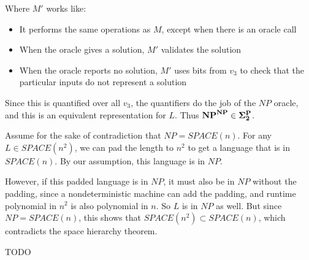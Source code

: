 \documentclass{article}
\newenvironment{problem}[2][Problem]{\begin{trivlist}
\item[\hskip \labelsep {\bfseries #1}\hskip \labelsep {\bfseries #2.}]}{\end{trivlist}}
\begin{document}
\begin{problem}{1}
  Where $M'$ works like:
  
  \begin{itemize}
    \item It performs the same operations as $M$, except when there is
      an oracle call
    \item When the oracle gives a solution, $M'$ validates the
      solution
    \item When the oracle reports no solution, $M'$ uses bits from
      $v_3$ to check that the particular inputs do not represent a solution
  \end{itemize}

  Since this is quantified over all $v_3$, the quantifiers do the job
  of the $NP$ oracle, and this is an equivalent representation for
  $L$. Thus $\bf{NP}^{\bf{NP}} \in \Sigma_2^{\bf{P}}$.
  
\end{problem}

\begin{problem}{2}

  Assume for the sake of contradiction that $NP = SPACE(n)$. For any
  $L \in SPACE(n^2)$, we can pad the length to $n^2$ to get a
  language that is in $SPACE(n)$. By our assumption, this language is
  in $NP$.

  However, if this padded language is in $NP$, it must also be in $NP$
  without the padding, since a nondeterministic machine can add the
  padding, and runtime polynomial in $n^2$ is also polynomial in
  $n$. So $L$ is in $NP$ as well. But since $NP = SPACE(n)$, this
  shows that $SPACE(n^2) \subset SPACE(n)$, which contradicts the
  space hierarchy theorem.
  
\end{problem}

\begin{problem}{3}
  TODO
\end{problem}
\end{document}
